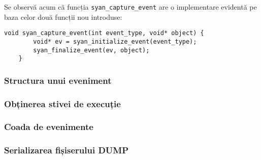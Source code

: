 Se observă acum că funcția \lstinline{syan_capture_event} are o
implementare evidentă pe baza celor două funcții nou introduse:
\begin{lstlisting}[caption=Implementarea funcției
                   \lstinline{syan_capture_event}]
    void syan_capture_event(int event_type, void* object) {
        void* ev = syan_initialize_event(event_type);
        syan_finalize_event(ev, object);
    }
\end{lstlisting}

\subsubsection{Structura unui eveniment}

\subsubsection{Obținerea stivei de execuție}

\subsubsection{Coada de evenimente}

\subsubsection{Serializarea fișiserului DUMP}
